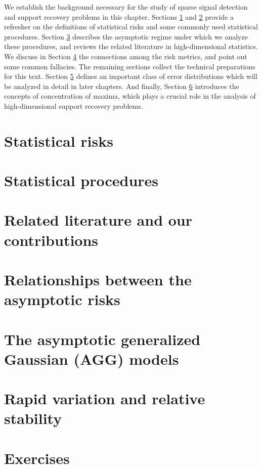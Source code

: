 
We establish the background necessary for the study of sparse signal detection and support recovery problems in this chapter.
Sections \ref{sec:risks} and \ref{sec:statistical-procedures} provide a refresher on the definitions of statistical risks and some commonly used statistical procedures.
Section \ref{sec:asymptotics} describes the asymptotic regime under which we analyze these procedures, and reviews the related literature in high-dimensional statistics.
We discuss in Section \ref{sec:risks-relations} the connections among the risk metrics, and point out some common fallacies.
The remaining sections collect the technical preparations for this text.
Section \ref{suppsec:AGG} defines an important class of error distributions which will be analyzed in detail in later chapters. 
And finally, Section \ref{subsec:RS} introduces the concepts of concentration of maxima, which plays a crucial role in the analysis of high-dimensional support recovery problems.


\section{Statistical risks}
\label{sec:risks}


\section{Statistical procedures}
\label{sec:statistical-procedures}


\section{Related literature and our contributions}
\label{sec:asymptotics}


\section{Relationships between the asymptotic risks}
\label{sec:risks-relations}


\section{The asymptotic generalized Gaussian (AGG) models}
\label{suppsec:AGG}


\section{Rapid variation and relative stability}
\label{subsec:RS}


\section{Exercises}
\label{sec:Exercises-Background}



